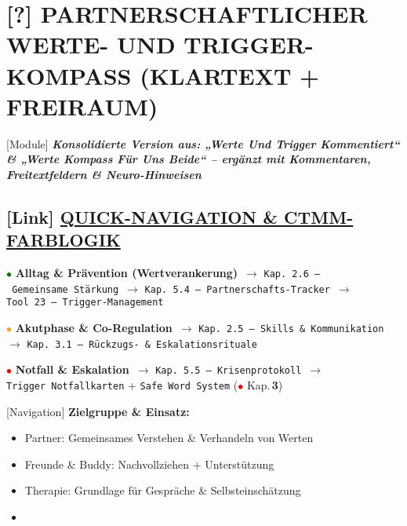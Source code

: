 \hypertarget{partnerschaftlicher-werte--und-trigger-kompass-klartext-freiraum}{%
\section{\texorpdfstring{[?] \textbf{PARTNERSCHAFTLICHER WERTE- UND TRIGGER-KOMPASS (KLARTEXT + FREIRAUM)}}{[?] PARTNERSCHAFTLICHER WERTE- UND TRIGGER-KOMPASS (KLARTEXT + FREIRAUM)}}\label{partnerschaftlicher-werte--und-trigger-kompass-klartext-freiraum}}

[Module] \emph{\textbf{Konsolidierte Version aus: „Werte Und Trigger Kommentiert`` \& „Werte Kompass Für Uns Beide`` -- ergänzt mit Kommentaren, Freitextfeldern \& Neuro-Hinweisen}}

\hypertarget{quick-navigation-ctmm-farblogik}{%
\subsection{\texorpdfstring{[Link] \textbf{\ul{QUICK-NAVIGATION \& CTMM-FARBLOGIK}}}{[Link] QUICK-NAVIGATION \& CTMM-FARBLOGIK}}\label{quick-navigation-ctmm-farblogik}}

\textcolor{green}{$\bullet$} \textbf{Alltag \& Prävention (Wertverankerung)}\
$\rightarrow$ \texttt{Kap.}\texttt{\,}\texttt{2.6\ }\texttt{--\ Gemeinsame\ Stärkung}\
$\rightarrow$ \texttt{Kap.}\texttt{\,}\texttt{5.4}\texttt{\ --\ Partnerschafts-Tracker}\
$\rightarrow$ \texttt{Tool\ 23\ }\texttt{--\ Trigger-Management}

\textcolor{orange}{$\bullet$} \textbf{Akutphase \& Co-Regulation}\
$\rightarrow$ \texttt{Kap.}\texttt{\,}\texttt{2.5\ }\texttt{--\ Skills\ \&\ Kommunikation}\
$\rightarrow$ \texttt{Kap.}\texttt{\,}\texttt{3.1\ }\texttt{--\ Rückzugs-\ \&\ Eskalationsrituale}

\textcolor{red}{$\bullet$} \textbf{Notfall \& Eskalation}\
$\rightarrow$ \texttt{Kap.}\texttt{\,}\texttt{5.5\ }\texttt{--\ Krisenprotokoll}\
$\rightarrow$ \texttt{Trigger\ Notfallkarten} + \texttt{Safe\ Word\ System} (\textcolor{red}{$\bullet$} Kap.\,\textbf{3})

[Navigation] \textbf{Zielgruppe \& Einsatz:}

\begin{itemize}
\tightlist
\item
  Partner: Gemeinsames Verstehen \& Verhandeln von Werten
\item
  Freunde \& Buddy: Nachvollziehen + Unterstützung
\item
  Therapie: Grundlage für Gespräche \& Selbsteinschätzung
\item
\end{itemize}

